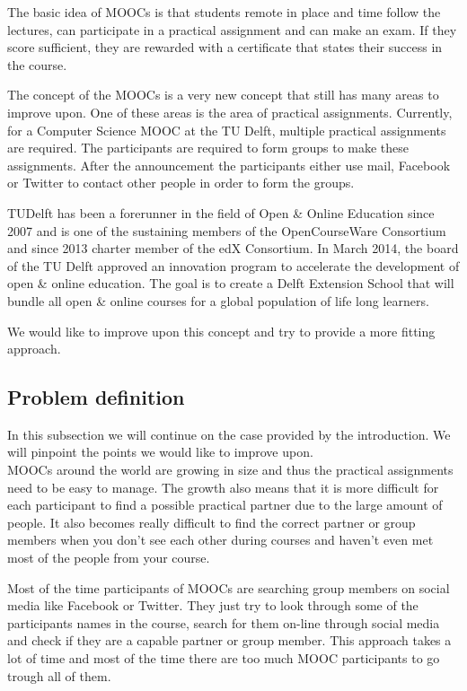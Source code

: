 \documentclass[]{article}
\begin{document}
The basic idea of MOOCs is that students remote in place and time follow the lectures, can participate in a practical assignment and can make an exam.
If they score sufficient, they are rewarded with a certificate that states their success in the course.

The concept of the MOOCs is a very new concept that still has many areas to improve upon.
One of these areas is the area of practical assignments.
Currently, for a Computer Science MOOC at the TU Delft, multiple practical assignments are required.
The participants are required to form groups to make these assignments.
After the announcement the participants either use mail, Facebook or  Twitter to contact other people in order to form the groups.

TUDelft has been a forerunner in the field of Open \& Online Education since 2007 and is one of the sustaining members of the OpenCourseWare Consortium and since 2013 charter member of the edX Consortium. 
In March 2014, the board of the TU Delft approved an innovation program to accelerate the development of open \& online education. 
The goal is to create a Delft Extension School that will bundle all open \& online courses for a global population of life long learners.

We would like to improve upon this concept and try to provide a more fitting approach.

\subsection{Problem definition}
In this subsection we will continue on the case provided by the introduction.
We will pinpoint the points we would like to improve upon.\\

MOOCs around the world are growing in size and thus the practical assignments need to be easy to manage.
The growth also means that it is more difficult for each participant to find a possible practical partner due to the large amount of people.
It also becomes really difficult to find the correct partner or group members when you don't see each other during courses and haven't even met most of the people from your course.

Most of the time participants of MOOCs are searching group members on social media like Facebook or Twitter.
They just try to look through some of the participants names in the course, search for them on-line through social media and check if they are a capable partner or group member.
This approach takes a lot of time and most of the time there are too much MOOC participants to go trough all of them.
\end{document}
